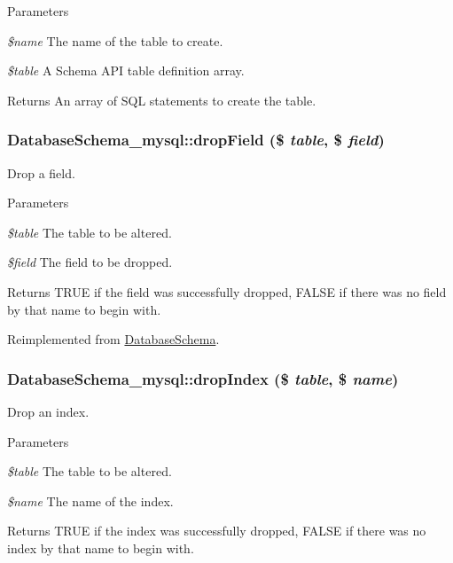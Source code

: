 \begin{DoxyParams}{Parameters}
\item[{\em \$name}]The name of the table to create. \item[{\em \$table}]A Schema API table definition array. \end{DoxyParams}
\begin{DoxyReturn}{Returns}
An array of SQL statements to create the table. 
\end{DoxyReturn}
\hypertarget{classDatabaseSchema__mysql_a87bb4ca35f69061ca489d45d4f74b3c7}{
\subsubsection[{dropField}]{\setlength{\rightskip}{0pt plus 5cm}DatabaseSchema\_\-mysql::dropField (\$ {\em table}, \/  \$ {\em field})}}
\label{classDatabaseSchema__mysql_a87bb4ca35f69061ca489d45d4f74b3c7}
Drop a field.


\begin{DoxyParams}{Parameters}
\item[{\em \$table}]The table to be altered. \item[{\em \$field}]The field to be dropped.\end{DoxyParams}
\begin{DoxyReturn}{Returns}
TRUE if the field was successfully dropped, FALSE if there was no field by that name to begin with. 
\end{DoxyReturn}


Reimplemented from \hyperlink{classDatabaseSchema_a9eee3ae81e40bba206015a83450e1d56}{DatabaseSchema}.\hypertarget{classDatabaseSchema__mysql_a2bd472fc5238f3b5d53284768475881c}{
\subsubsection[{dropIndex}]{\setlength{\rightskip}{0pt plus 5cm}DatabaseSchema\_\-mysql::dropIndex (\$ {\em table}, \/  \$ {\em name})}}
\label{classDatabaseSchema__mysql_a2bd472fc5238f3b5d53284768475881c}
Drop an index.


\begin{DoxyParams}{Parameters}
\item[{\em \$table}]The table to be altered. \item[{\em \$name}]The name of the index.\end{DoxyParams}
\begin{DoxyReturn}{Returns}
TRUE if the index was successfully dropped, FALSE if there was no index by that name to begin with. 
\end{DoxyReturn}


